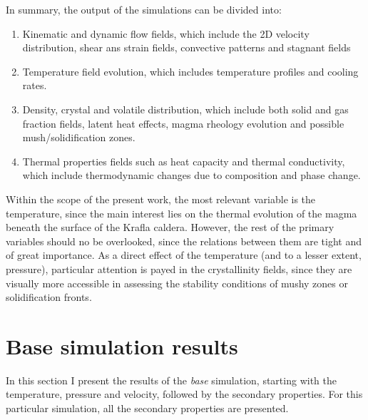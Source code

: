 In summary, the output of the simulations can be divided into: 
\begin{enumerate} 
	\item Kinematic and dynamic flow fields, which include the 2D velocity distribution, shear ans strain fields, convective patterns and stagnant fields
	\item Temperature field evolution, which includes temperature profiles and cooling rates.
	\item Density, crystal and volatile distribution, which include both solid and gas fraction fields, latent heat effects, magma rheology evolution and possible mush/solidification zones.
	\item Thermal properties fields such as heat capacity and thermal conductivity, which include thermodynamic changes due to composition and phase change. 
\end{enumerate}

Within the scope of the present work, the most relevant variable is the temperature, since the main interest lies on the thermal evolution of the magma beneath the surface of the Krafla caldera. However, the rest of the primary variables should no be overlooked, since the relations between them are tight and of great importance. As a direct effect of the temperature (and to a lesser extent, pressure), particular attention is payed in the crystallinity fields, since they are visually more accessible in assessing the stability conditions of mushy zones or solidification fronts.

\section{Base simulation results}
In this section I present the results of the \textit{base} simulation, starting with the temperature, pressure and velocity, followed by the secondary properties. For this particular simulation, all the secondary properties are presented.

